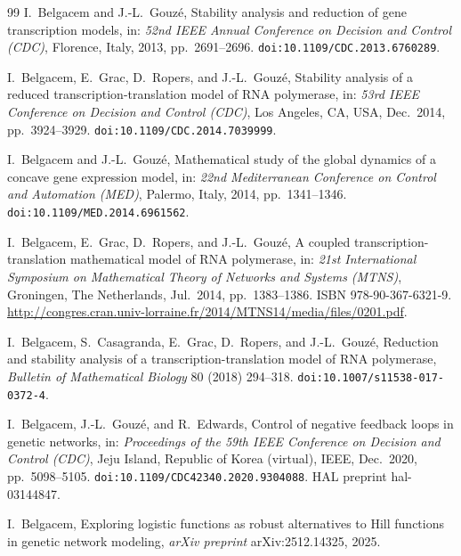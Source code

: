 \documentclass[12pt]{article}
\begin{document}
\begin{thebibliography}{99}
I.~Belgacem and J.-L.~Gouz\'e,
\newblock Stability analysis and reduction of gene transcription models,
\newblock in: \emph{52nd IEEE Annual Conference on Decision and Control (CDC)},
  Florence, Italy, 2013, pp.\ 2691--2696.
\newblock \texttt{doi:10.1109/CDC.2013.6760289}.

I.~Belgacem, E.~Grac, D.~Ropers, and J.-L.~Gouz\'e,
\newblock Stability analysis of a reduced transcription-translation model of
  {RNA} polymerase,
\newblock in: \emph{53rd IEEE Conference on Decision and Control (CDC)}, Los
  Angeles, CA, USA, Dec.\ 2014, pp.\ 3924--3929.
\newblock \texttt{doi:10.1109/CDC.2014.7039999}.

I.~Belgacem and J.-L.~Gouz\'e,
\newblock Mathematical study of the global dynamics of a concave gene expression
  model,
\newblock in: \emph{22nd Mediterranean Conference on Control and Automation
  (MED)}, Palermo, Italy, 2014, pp.\ 1341--1346.
\newblock \texttt{doi:10.1109/MED.2014.6961562}.

I.~Belgacem, E.~Grac, D.~Ropers, and J.-L.~Gouz\'e,
\newblock A coupled transcription-translation mathematical model of {RNA}
  polymerase,
\newblock in: \emph{21st International Symposium on Mathematical Theory of
  Networks and Systems (MTNS)}, Groningen, The Netherlands, Jul.\ 2014,
  pp.\ 1383--1386.
\newblock ISBN 978-90-367-6321-9.
\newblock \url{http://congres.cran.univ-lorraine.fr/2014/MTNS14/media/files/0201.pdf}.

I.~Belgacem, S.~Casagranda, E.~Grac, D.~Ropers, and J.-L.~Gouz\'e,
\newblock Reduction and stability analysis of a transcription-translation model
  of {RNA} polymerase,
\newblock \emph{Bulletin of Mathematical Biology} 80 (2018) 294--318.
\newblock \texttt{doi:10.1007/s11538-017-0372-4}.

I.~Belgacem, J.-L.~Gouz\'e, and R.~Edwards,
\newblock Control of negative feedback loops in genetic networks,
\newblock in: \emph{Proceedings of the 59th IEEE Conference on Decision and
  Control (CDC)}, Jeju Island, Republic of Korea (virtual),
\newblock IEEE, Dec.\ 2020, pp.\ 5098--5105.
\newblock \texttt{doi:10.1109/CDC42340.2020.9304088}.
\newblock HAL preprint hal-03144847.

I.~Belgacem,
\newblock Exploring logistic functions as robust alternatives to {H}ill functions
  in genetic network modeling,
\newblock \emph{arXiv preprint} arXiv:2512.14325, 2025.


\end{thebibliography}
\end{document}
